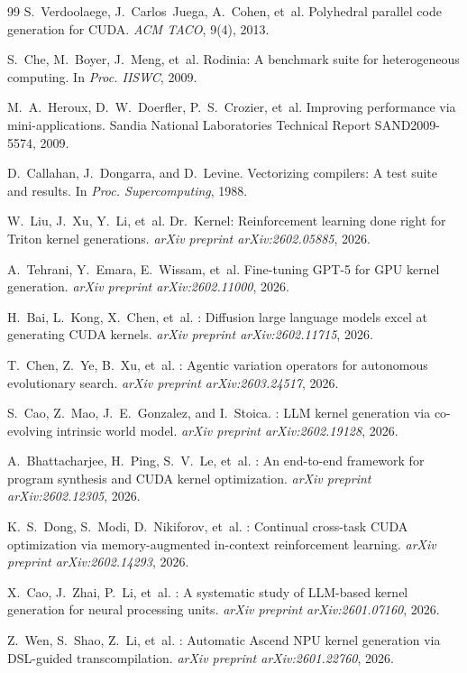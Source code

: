 \documentclass[sigconf]{acmart}
\begin{document}
\begin{thebibliography}{99}
S.~Verdoolaege, J.~Carlos~Juega, A.~Cohen, et~al.
\newblock Polyhedral parallel code generation for {CUDA}.
\newblock \emph{ACM TACO}, 9(4), 2013.

S.~Che, M.~Boyer, J.~Meng, et~al.
\newblock Rodinia: A benchmark suite for heterogeneous computing.
\newblock In \emph{Proc. IISWC}, 2009.

M.~A.~Heroux, D.~W.~Doerfler, P.~S.~Crozier, et~al.
\newblock Improving performance via mini-applications.
\newblock Sandia National Laboratories Technical Report SAND2009-5574, 2009.

D.~Callahan, J.~Dongarra, and D.~Levine.
\newblock Vectorizing compilers: A test suite and results.
\newblock In \emph{Proc. Supercomputing}, 1988.

W.~Liu, J.~Xu, Y.~Li, et~al.
\newblock Dr.~Kernel: Reinforcement learning done right for {Triton} kernel generations.
\newblock \emph{arXiv preprint arXiv:2602.05885}, 2026.

A.~Tehrani, Y.~Emara, E.~Wissam, et~al.
\newblock Fine-tuning {GPT-5} for {GPU} kernel generation.
\newblock \emph{arXiv preprint arXiv:2602.11000}, 2026.

H.~Bai, L.~Kong, X.~Chen, et~al.
: Diffusion large language models excel at generating {CUDA} kernels.
\newblock \emph{arXiv preprint arXiv:2602.11715}, 2026.

T.~Chen, Z.~Ye, B.~Xu, et~al.
: Agentic variation operators for autonomous evolutionary search.
\newblock \emph{arXiv preprint arXiv:2603.24517}, 2026.

S.~Cao, Z.~Mao, J.~E.~Gonzalez, and I.~Stoica.
: {LLM} kernel generation via co-evolving intrinsic world model.
\newblock \emph{arXiv preprint arXiv:2602.19128}, 2026.

A.~Bhattacharjee, H.~Ping, S.~V.~Le, et~al.
: An end-to-end framework for program synthesis and {CUDA} kernel optimization.
\newblock \emph{arXiv preprint arXiv:2602.12305}, 2026.

K.~S.~Dong, S.~Modi, D.~Nikiforov, et~al.
: Continual cross-task {CUDA} optimization via memory-augmented in-context reinforcement learning.
\newblock \emph{arXiv preprint arXiv:2602.14293}, 2026.

X.~Cao, J.~Zhai, P.~Li, et~al.
: A systematic study of {LLM}-based kernel generation for neural processing units.
\newblock \emph{arXiv preprint arXiv:2601.07160}, 2026.

Z.~Wen, S.~Shao, Z.~Li, et~al.
: Automatic {Ascend} {NPU} kernel generation via {DSL}-guided transcompilation.
\newblock \emph{arXiv preprint arXiv:2601.22760}, 2026.

\end{thebibliography}
\end{document}
